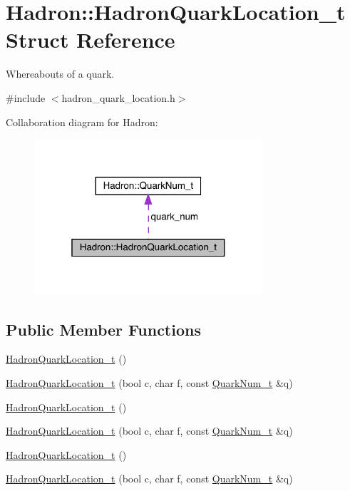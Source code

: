 \hypertarget{structHadron_1_1HadronQuarkLocation__t}{}\section{Hadron\+:\+:Hadron\+Quark\+Location\+\_\+t Struct Reference}
\label{structHadron_1_1HadronQuarkLocation__t}


Whereabouts of a quark.  




{\ttfamily \#include $<$hadron\+\_\+quark\+\_\+location.\+h$>$}



Collaboration diagram for Hadron\+:\nopagebreak
\begin{figure}[H]
\begin{center}
\leavevmode
\includegraphics[width=241pt]{dc/d2a/structHadron_1_1HadronQuarkLocation__t__coll__graph}
\end{center}
\end{figure}
\subsection*{Public Member Functions}
\begin{DoxyCompactItemize}
\item 
\mbox{\hyperlink{structHadron_1_1HadronQuarkLocation__t_a134386bb80be45cf0767a6c45e3b6f52}{Hadron\+Quark\+Location\+\_\+t}} ()
\item 
\mbox{\hyperlink{structHadron_1_1HadronQuarkLocation__t_a214dddf7650dc22b5c424715fc27dd42}{Hadron\+Quark\+Location\+\_\+t}} (bool c, char f, const \mbox{\hyperlink{structHadron_1_1QuarkNum__t}{Quark\+Num\+\_\+t}} \&q)
\item 
\mbox{\hyperlink{structHadron_1_1HadronQuarkLocation__t_a134386bb80be45cf0767a6c45e3b6f52}{Hadron\+Quark\+Location\+\_\+t}} ()
\item 
\mbox{\hyperlink{structHadron_1_1HadronQuarkLocation__t_a214dddf7650dc22b5c424715fc27dd42}{Hadron\+Quark\+Location\+\_\+t}} (bool c, char f, const \mbox{\hyperlink{structHadron_1_1QuarkNum__t}{Quark\+Num\+\_\+t}} \&q)
\item 
\mbox{\hyperlink{structHadron_1_1HadronQuarkLocation__t_a134386bb80be45cf0767a6c45e3b6f52}{Hadron\+Quark\+Location\+\_\+t}} ()
\item 
\mbox{\hyperlink{structHadron_1_1HadronQuarkLocation__t_a214dddf7650dc22b5c424715fc27dd42}{Hadron\+Quark\+Location\+\_\+t}} (bool c, char f, const \mbox{\hyperlink{structHadron_1_1QuarkNum__t}{Quark\+Num\+\_\+t}} \&q)
\end{DoxyCompactItemize}
